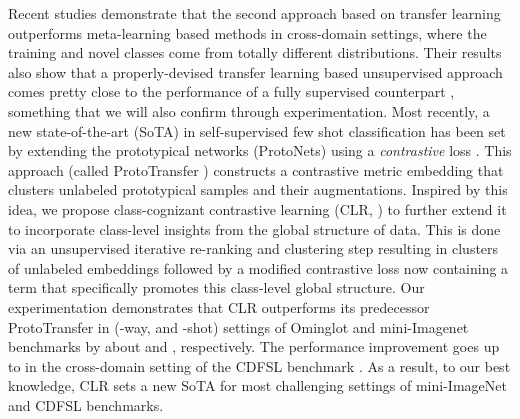\documentclass{article}
\begin{document}
 Recent studies \citep{Medina2020Self-SupervisedClassification, chen2021self, dhillon2019baseline} demonstrate that the second approach based on transfer learning outperforms meta-learning based methods in cross-domain settings, where the training and novel classes come from totally different distributions. Their results also show that a properly-devised transfer learning based unsupervised approach comes pretty close to the performance of a fully supervised counterpart \citep{Medina2020Self-SupervisedClassification, Ji2019UnsupervisedTraining}, something that we will also confirm through experimentation. Most recently, a new state-of-the-art (SoTA) in self-supervised few shot classification has been set by extending the prototypical networks (ProtoNets) \citep{Snell2017PrototypicalLearning} using a \emph{contrastive} loss \citep{chen2020simple}. This approach (called ProtoTransfer \citep{Medina2020Self-SupervisedClassification}) constructs a contrastive metric embedding that clusters unlabeled prototypical samples and their augmentations. Inspired by this idea, we propose class-cognizant contrastive learning (CLR, ) to further extend it to incorporate class-level insights from the global structure of data. This is done via an unsupervised iterative re-ranking and clustering step resulting in clusters of unlabeled embeddings followed by a modified contrastive loss now containing a term that specifically promotes this class-level global structure. Our experimentation demonstrates that CLR outperforms its predecessor ProtoTransfer in (-way,  and -shot) settings of Ominglot \citep{Lake2015Human-levelInduction} and mini-Imagenet \citep{Vinyals2016MatchingLearning} benchmarks by about  and , respectively. The performance improvement goes up to  in the cross-domain setting of the CDFSL benchmark \citep{guo2019new}. As a result, to our best knowledge, CLR sets a new SoTA for most challenging settings of mini-ImageNet and CDFSL benchmarks.
\end{document}
